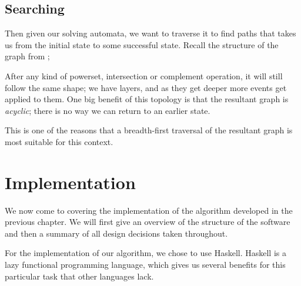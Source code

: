 \documentclass[12pt, a4paper]{article}
\begin{document}
\subsection{Searching}

Then given our solving automata, we want to traverse it to find paths that takes
us from the initial state to some successful state. Recall the structure of the
graph \mestar from ;

\begin{center}
\end{center}

After any kind of powerset, intersection or complement operation, it will still
follow the same shape; we have layers, and as they get deeper more events get
applied to them. One big benefit of this topology is that the resultant graph is
\textit{acyclic}; there is no way we can return to an earlier state.

This is one of the reasons that a breadth-first traversal of the resultant graph
is most suitable for this context. 

\newpage 

\section{Implementation}

We now come to covering the implementation of the algorithm developed in the
previous chapter. We will first give an overview of the structure of the
software and then a summary of all design decisions taken throughout. 

\bigskip

For the implementation of our algorithm, we chose to use Haskell. Haskell is a
lazy functional programming language, which gives us several benefits for this
particular task that other languages lack. 
\end{document}
